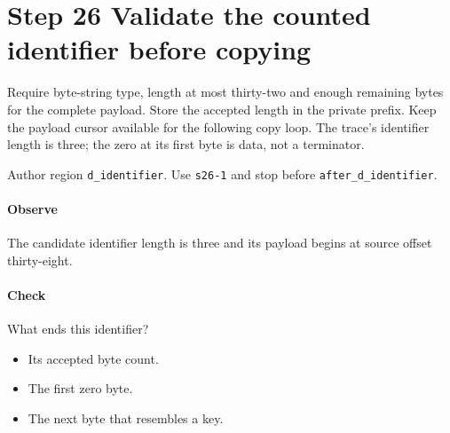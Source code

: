 \section{Step 26 Validate the counted identifier before copying}\label{cbor-s26}
Require byte-string type, length at most thirty-two and enough remaining bytes for the complete payload. Store the accepted length in the private prefix. Keep the payload cursor available for the following copy loop. The trace's identifier length is three; the zero at its first byte is data, not a terminator.

Author region \texttt{d\_identifier}. Use \texttt{s26-1} and stop before \texttt{after\_d\_identifier}. 

\paragraph{Observe} The candidate identifier length is three and its payload begins at source offset thirty-eight.

\paragraph{Check} What ends this identifier?
\begin{itemize}
\item[A.] Its accepted byte count.
\item[B.] The first zero byte.
\item[C.] The next byte that resembles a key.
\end{itemize}
